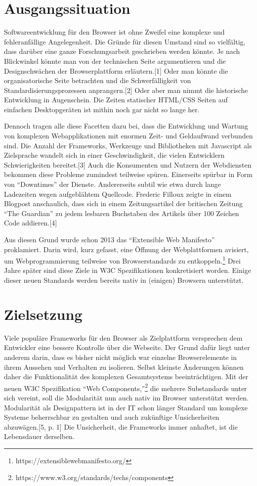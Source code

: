 \section{Ausgangssituation}\label{ausgangssituation}

Softwareentwicklung für den Browser ist ohne Zweifel eine komplexe und
fehleranfällige Angelegenheit. Die Gründe für diesen Umstand sind so
vielfältig, dass darüber eine ganze Forschungsarbeit geschrieben werden
könnte. Je nach Blickwinkel könnte man von der technischen Seite
argumentieren und die Designschwächen der Browserplattform
erläutern.{[}1{]} Oder man könnte die organisatorische Seite betrachten
und die Schwerfälligkeit von Standardisierungsprozessen
anprangern.{[}2{]} Oder aber man nimmt die historische Entwicklung in
Augenschein. Die Zeiten statischer HTML/CSS Seiten auf einfachen
Desktopgeräten ist mithin noch gar nicht so lange her.

Dennoch tragen alle diese Facetten dazu bei, dass die Entwicklung und
Wartung von komplexen Webapplikationen mit enormen Zeit- und Geldaufwand
verbunden sind. Die Anzahl der Frameworks, Werkzeuge und Bibliotheken
mit Javascript als Zielsprache wandelt sich in einer Geschwindigkeit,
die vielen Entwicklern Schwierigkeiten bereitet.{[}3{]} Auch die
Konsumenten und Nutzern der Webdiensten bekommen diese Probleme
zumindest teilweise spüren. Einerseits spürbar in Form von ``Downtimes''
der Dienste. Andererseits subtil wie etwa durch lange Ladezeiten wegen
aufgeblähtem Quellcode. Frederic Filloux zeigte in einem Blogpost
anschaulich, dass sich in einem Zeitungsartikel der britischen Zeitung
``The Guardian'' zu jedem lesbaren Buchstaben des Artikels über 100
Zeichen Code addieren.{[}4{]}

Aus diesen Grund wurde schon 2013 das ``Extensible Web Manifesto''
proklamiert. Darin wird, kurz gefasst, eine Öffnung der Webplattformen
avisiert, um Webprogrammierung teilweise von Browserstandards zu
entkoppeln.\footnote{https://extensiblewebmanifesto.org/} Drei Jahre
später sind diese Ziele in W3C Spezifikationen konkretisiert worden.
Einige dieser neuen Standards werden bereits nativ in (einigen) Browsern
unterstützt.

\section{Zielsetzung}\label{zielsetzung}

Viele populäre Frameworks für den Browser als Zielplattform versprechen
dem Entwickler eine bessere Kontrolle über die Webseite. Der Grund dafür
liegt unter anderem darin, dass es bisher nicht möglich war einzelne
Browserelemente in ihrem Aussehen und Verhalten zu isolieren. Selbst
kleinste Änderungen können daher die Funktionalität des komplexen
Gesamtsystems beeinträchtigen. Mit der neuen W3C Spezifikation ``Web
Components,''\footnote{https://www.w3.org/standards/techs/components}
die mehrere Substandards unter sich vereint, soll die Modularität nun
auch nativ im Browser unterstützt werden. Modularität als Designpattern
ist in der IT schon länger Standard um komplexe Systeme beherrschbar zu
gestalten und auch zukünftige Unsicherheiten abzuwägen.{[}5, p. 1{]} Die
Unsicherheit, die Frameworks immer anhaftet, ist die Lebensdauer
derselben.

